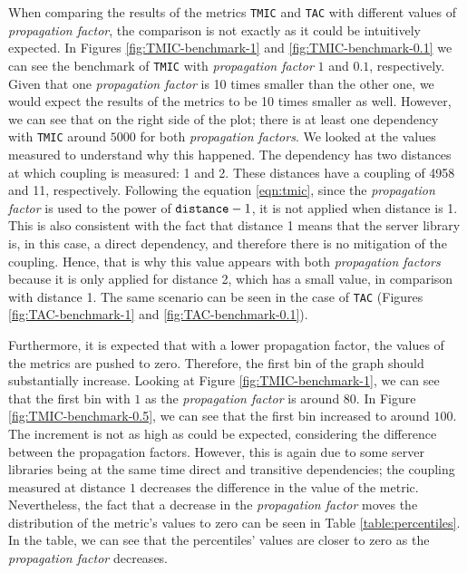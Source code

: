 When comparing the results of the metrics \texttt{TMIC} and \texttt{TAC} with different values of \textit{propagation factor}, the comparison is not exactly as it could be intuitively expected. In Figures \ref{fig:TMIC-benchmark-1} and \ref{fig:TMIC-benchmark-0.1} we can see the benchmark of \texttt{TMIC} with \textit{propagation factor} $1$ and $0.1$, respectively. Given that one \textit{propagation factor} is 10 times smaller than the other one, we would expect the results of the metrics to be 10 times smaller as well. However, we can see that on the right side of the plot; there is at least one dependency with \texttt{TMIC} around $5000$ for both \textit{propagation factors}. We looked at the values measured to understand why this happened. The dependency has two distances at which coupling is measured: 1 and 2. These distances have a coupling of 4958 and 11, respectively. Following the equation \ref{eqn:tmic}, since the \textit{propagation factor} is used to the power of $\verb|distance| - 1$, it is not applied when distance is 1. This is also consistent with the fact that distance 1 means that the server library is, in this case, a direct dependency, and therefore there is no mitigation of the coupling. Hence, that is why this value appears with both \textit{propagation factors} because it is only applied for distance 2, which has a small value, in comparison with distance 1. The same scenario can be seen in the case of \texttt{TAC} (Figures \ref{fig:TAC-benchmark-1} and \ref{fig:TAC-benchmark-0.1}).

Furthermore, it is expected that with a lower propagation factor, the values of the metrics are pushed to zero. Therefore, the first bin of the graph should substantially increase. Looking at Figure \ref{fig:TMIC-benchmark-1}, we can see that the first bin with $1$ as the \textit{propagation factor} is around $80$. In Figure \ref{fig:TMIC-benchmark-0.5}, we can see that the first bin increased to around $100$. The increment is not as high as could be expected, considering the difference between the propagation factors. However, this is again due to some server libraries being at the same time direct and transitive dependencies; the coupling measured at distance $1$ decreases the difference in the value of the metric. Nevertheless, the fact that a decrease in the \textit{propagation factor} moves the distribution of the metric's values to zero can be seen in Table \ref{table:percentiles}. In the table, we can see that the percentiles' values are closer to zero as the \textit{propagation factor} decreases.

